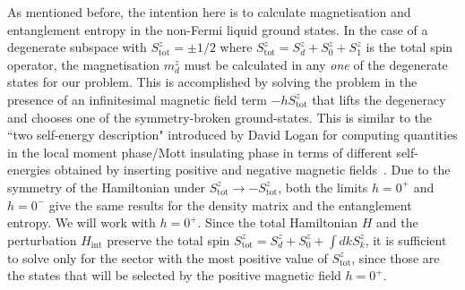 As mentioned before, the intention here is to calculate magnetisation and entanglement entropy in the non-Fermi liquid ground states. In the case of a degenerate subspace with \(S_\text{tot}^z = \pm 1/2\) where \(S_\text{tot}^z = S_d^z + S_0^z + S_1^z\) is the total spin operator, the magnetisation \(m_d^z\) must be calculated in any {\it one} of the degenerate states for our problem. This is accomplished by solving the problem in the presence of an infinitesimal magnetic field term \(-h S_\text{tot}^z\) that lifts the degeneracy and chooses one of the symmetry-broken ground-states. This is similar to the ``two self-energy description" introduced by David Logan for computing quantities in the local moment phase/Mott insulating phase in terms of different self-energies obtained by inserting positive and negative magnetic fields~\cite{Logan_2000,logan_2014,Logan_2015}. Due to the symmetry of the Hamiltonian under \(S_\text{tot}^z \to -S_\text{tot}^z\), both the limits \(h = 0^+\) and \(h=0^-\) give the same results for the density matrix and the entanglement entropy. We will work with \(h = 0^+\). Since the total Hamiltonian \(H\) and the perturbation \(H_\text{int}\) preserve the total spin \(S_\text{tot}^z = S_d^z + S_0^z + \int dk S_k^z\), it is sufficient to solve only for the sector with the most positive value of \(S_\text{tot}^z\), since those are the states that will be selected by the positive magnetic field \(h = 0^+\).

